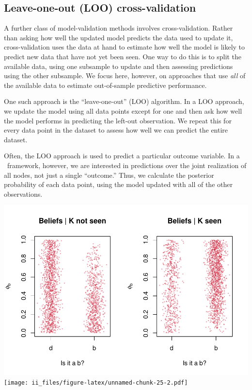 \documentclass[
  12pt,
]{book}
\begin{document}
\hypertarget{leave-one-out-loo-cross-validation}{%
\subsection{Leave-one-out (LOO) cross-validation}\label{leave-one-out-loo-cross-validation}}

A further class of model-validation methods involves cross-validation. Rather than asking how well the updated model predicts the data used to update it, cross-validation uses the data at hand to estimate how well the model is likely to predict new data that have not yet been seen. One way to do this is to split the available data, using one subsample to update and then assessing predictions using the other subsample. We focus here, however, on approaches that use \emph{all} of the available data to estimate out-of-sample predictive performance.

One such approach is the ``leave-one-out'' (LOO) algorithm. In a LOO approach, we update the model using all data points except for one and then ask how well the model performs in predicting the left-out observation. We repeat this for every data point in the dataset to assess how well we can predict the entire dataset.

Often, the LOO approach is used to predict a particular outcome variable. In a \CausalQuery~framework, however, we are interested in predictions over the joint realization of all nodes, not just a single ``outcome.'' Thus, we calculate the posterior probability of each data point, using the model updated with all of the other observations.

\includegraphics{ii_files/figure-latex/unnamed-chunk-25-1.pdf} \texttt{[image: ii\_files/figure-latex/unnamed-chunk-25-2.pdf]}
\end{document}
